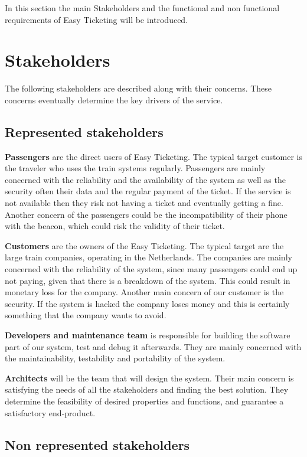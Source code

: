 In this section the main Stakeholders and the functional and non functional requirements of Easy Ticketing will be introduced.

\section{Stakeholders}
The following stakeholders are described along with their concerns. These concerns eventually determine the key drivers of the service.

\subsection{Represented stakeholders}


\textbf{Passengers}  are the direct users of Easy Ticketing. The typical target customer is the traveler who uses the train systems regularly. Passengers are mainly concerned with the reliability and the availability of the system as well as the security often their data and the regular payment of the ticket. If the service is not available then they risk not having a ticket and eventually getting a fine.  Another concern of the passengers could be the incompatibility of their phone with the beacon, which could risk the validity of their ticket.

\textbf{Customers} are the owners of the Easy Ticketing. The typical target are the large train companies, operating in the Netherlands. The companies are mainly concerned with the reliability of the system, since many passengers could end up not paying, given that there is a breakdown of the system. This could result in monetary loss for the company. Another main concern of our customer is the security. If the system is hacked the  company loses money and this is certainly something that the company wants to avoid.

\textbf{Developers and maintenance team} is responsible for building the software part of our system, test and debug it afterwards. They are mainly concerned with the maintainability, testability and portability of the system.

\textbf{Architects} will be the team that will design the system. Their main concern is satisfying the needs of all the stakeholders and finding the best solution. They determine the feasibility of desired properties and functions, and guarantee a satisfactory end-product.


\subsection{Non represented stakeholders}


